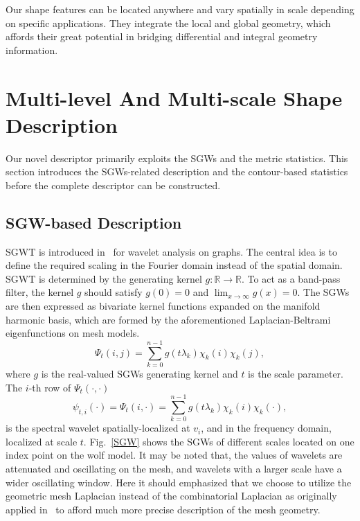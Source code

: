 Our shape features can be located anywhere and vary spatially in scale
depending on specific applications. They integrate the local and global
geometry, which affords their great potential in bridging differential
and integral geometry information.

\section{Multi-level And Multi-scale Shape Description}
\label{sec:Des}

Our novel descriptor primarily exploits the SGWs and the metric
statistics. This section introduces the SGWs-related description and
the contour-based statistics before the complete descriptor can be
constructed.

\subsection{SGW-based Description}

SGWT is introduced in~\cite{Hammond2011} for wavelet analysis
on graphs. The central idea is to define the required scaling in the
Fourier domain instead of the spatial domain. SGWT is determined by
the generating kernel $g \colon \mathbb{R} \rightarrow \mathbb{R}$. To
act as a band-pass filter, the kernel $g$ should satisfy $g(0) = 0$
and $\lim_{x \rightarrow \infty} g(x) = 0$. The SGWs are then
expressed as bivariate kernel functions
expanded on the manifold harmonic basis, which are formed by the
aforementioned Laplacian-Beltrami eigenfunctions on mesh models.
\begin{equation}
\label{eq:SGW}
\Psi_{t}(i,j)=\sum_{k=0}^{n-1}g(t\lambda_k) \chi_k(i)\chi_k(j),
\end{equation}
where $g$ is the real-valued SGWs generating kernel and $t$ is the
scale parameter. The $i$-th row of $\Psi_{t}(\cdot,\cdot)$
\begin{equation}
\label{eq:SGW_vert}
\psi_{t,i}(\cdot) = \Psi_{t}(i,\cdot)=\sum_{k=0}^{n-1}g(t\lambda_k) \chi_k(i)\chi_k(\cdot),
\end{equation}
is the spectral wavelet spatially-localized at $v_i$, and in the
frequency domain, localized at scale $t$. Fig.~\ref{SGW} shows the
SGWs of different scales located on one index point on the wolf model.
It may be noted that, the values of wavelets are attenuated and
oscillating on the mesh, and wavelets with a larger scale have a wider
oscillating window. Here it should emphasized that we choose to
utilize the geometric mesh Laplacian instead of the combinatorial
Laplacian as originally applied in~\cite{Hammond2011} to afford much
more precise description of the mesh geometry.

